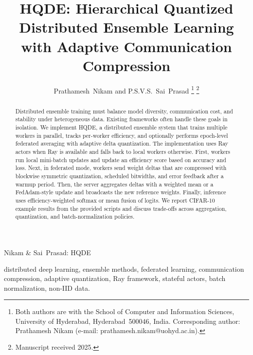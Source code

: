 \documentclass[journal,twoside]{IEEEtran}
\newcommand{\hqde}{\mbox{HQDE}\xspace}
\begin{document}
\title{HQDE: Hierarchical Quantized Distributed Ensemble Learning\\
       with Adaptive Communication Compression}

\author{Prathamesh~Nikam and P.S.V.S.~Sai~Prasad%
\thanks{Both authors are with the School of Computer and Information
Sciences, University of Hyderabad, Hyderabad~500046, India.
Corresponding author: Prathamesh Nikam
(e-mail: prathamesh.nikam@uohyd.ac.in).}%
\thanks{Manuscript received 2025.}}

%
{Nikam \& Sai~Prasad: HQDE}

\maketitle


\begin{abstract}
Distributed ensemble training must balance model diversity, communication
cost, and stability under heterogeneous data. Existing frameworks often
handle these goals in isolation. We implement \hqde{}, a distributed
ensemble system that trains multiple workers in parallel, tracks
per-worker efficiency, and optionally performs epoch-level federated
averaging with adaptive delta quantization. The implementation uses Ray
actors when Ray is available and falls back to local workers otherwise.
First, workers run local mini-batch updates and update an efficiency
score based on accuracy and loss. Next, in federated mode, workers send
weight deltas that are compressed with blockwise symmetric quantization,
scheduled bitwidths, and error feedback after a warmup period. Then, the
server aggregates deltas with a weighted mean or a FedAdam-style update
and broadcasts the new reference weights. Finally, inference uses
efficiency-weighted softmax or mean fusion of logits. We report CIFAR-10
example results from the provided scripts and discuss trade-offs across
aggregation, quantization, and batch-normalization policies.
\end{abstract}

\begin{IEEEkeywords}
distributed deep learning, ensemble methods, federated learning,
communication compression, adaptive quantization, Ray framework,
stateful actors, batch normalization, non-IID data.
\end{IEEEkeywords}
\end{document}
